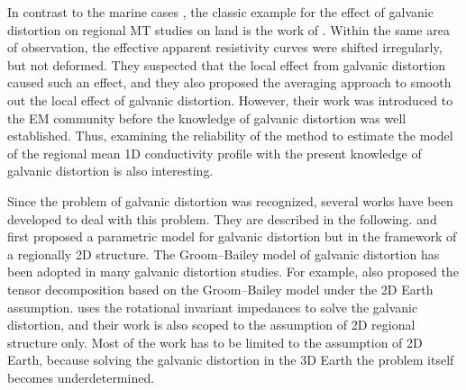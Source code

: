 
	In contrast to the marine cases \citep[e.g.,][]{baba2010a}, the classic example for the effect of galvanic distortion on regional MT studies on land is the work of \citet{berdichevsky1980a}. 
	Within the same area of observation, the effective apparent resistivity curves were shifted irregularly, but not deformed. 
	They suspected that the local effect from galvanic distortion caused such an effect, and they also proposed the averaging approach to smooth out the local effect of galvanic distortion.
	However, their work was introduced to the EM community before the knowledge of galvanic distortion was well established.
	Thus, examining the reliability of the method to estimate the model of the regional mean 1D conductivity profile with the present knowledge of galvanic distortion is also interesting.
	

	Since the problem of galvanic distortion was recognized, several works have been developed to deal with this problem. They are described in the following.
	\citet{groom1989a} and \citet{bahr1988a} first proposed a parametric model for galvanic distortion but in the framework of a regionally 2D structure. 
	The Groom--Bailey model of galvanic distortion \citep{groom1989a} has been adopted in many galvanic distortion studies. For example, \citet{mcneice2001a} also proposed the tensor decomposition based on the Groom--Bailey model under the 2D Earth assumption.
	\citet{gomez-trevino2014a} uses the rotational invariant impedances to solve the galvanic distortion, and their work is also scoped to the assumption of 2D regional structure only.
	Most of the work has  to be limited to the assumption of 2D Earth, because solving the galvanic distortion in the 3D Earth the problem itself becomes underdetermined.

